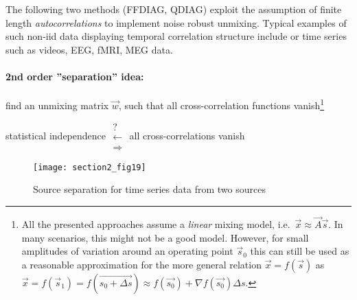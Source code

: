 The following two methods (FFDIAG, QDIAG) exploit the assumption of
finite length \emph{autocorrelations} to implement noise robust
unmixing. Typical examples of such non-iid data displaying temporal
correlation structure include or time series such as videos, EEG, fMRI, MEG data.



\paragraph{2nd order ''separation'' idea:} find an unmixing matrix $\vec{w}$,
such that all cross-correlation functions vanish\footnote{All the
  presented approaches assume a \emph{linear} mixing model, i.e.\
  $\vec{x} \approx \vec{A} \vec{s}$. In many scenarios, this might not
  be a good model. However, for small amplitudes of variation around
  an operating point $\vec{s}_0$ this can still be used as a reasonable
  approximation for the more general relation $\vec{x} = f(\vec{s})$ as $\vec{x} =
  f(\vec{s}_1) = f(\vec{s_0 + \Delta s}) \approx f(\vec{s_0}) + \nabla f(\vec{s_0})  \Delta s$.}
\begin{center}
	statistical independence $\substack{ \text{?} 
		\\ \leftarrow
		\\ \Rightarrow }$ all cross-correlations vanish
\end{center}
\begin{figure}[h]
  \centering
  \texttt{[image: section2\_fig19]}  
  \caption{Source separation for time series data from two sources}
  \label{fig:timeSeriesICA}
\end{figure}


